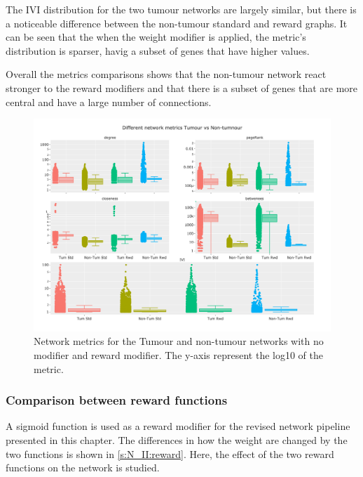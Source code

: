 The IVI distribution for the two tumour networks are largely similar, but there is a noticeable difference between the non-tumour standard and reward graphs. It can be seen that the when the weight modifier is applied, the metric's distribution is sparser, havig a subset of genes that have higher values.

Overall the metrics comparisons shows that the non-tumour network react stronger to the reward modifiers and that there is a subset of genes that are more central and have a large number of connections.

\begin{figure}[!htb]    
    \centering
    \includegraphics[width=1.0\textwidth,height=0.7\textheight,keepaspectratio]{Sections/Network_II/validation/network_comparison.png}
    \caption{Network metrics for the Tumour and non-tumour networks with no modifier and reward modifier. The y-axis represent the log10 of the metric. }
    \label{fig:N_II:net_metrics_comp}
\end{figure}


\subsubsection{Comparison between reward functions} \label{s:N_II:reward_comp}



A sigmoid function is used as a reward modifier for the revised network pipeline presented in this chapter. The differences in how the weight are changed by the two functions is shown in \cref{s:N_II:reward}. Here, the effect of the two reward functions on the network is studied.

